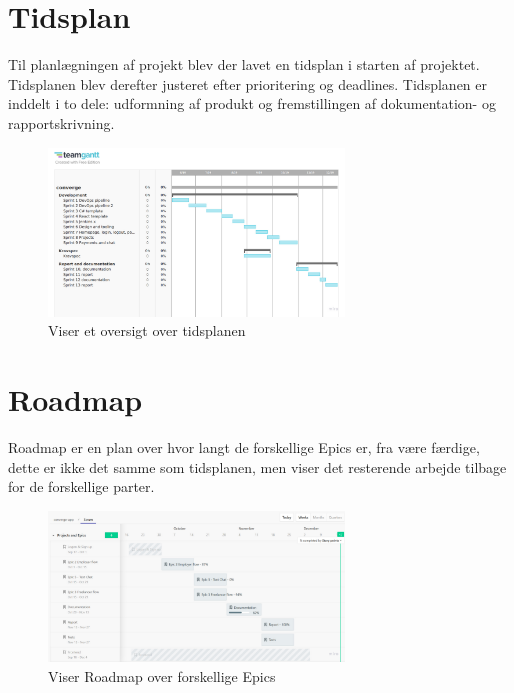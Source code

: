 \section{Tidsplan}

Til planlægningen af projekt blev der lavet en tidsplan i starten af projektet. Tidsplanen blev derefter justeret efter prioritering og deadlines. Tidsplanen er inddelt i to dele: udformning af produkt og fremstillingen af dokumentation- og rapportskrivning.

\begin{figure}[H]
    \centering
\includegraphics[width=0.7\textwidth]{Billeder/schedule1.pdf}
\caption{Viser et oversigt over tidsplanen}
\label{fig:figure4}
\end{figure}
\newpage
\section{Roadmap}

Roadmap er en plan over hvor langt de forskellige Epics er, fra være færdige, dette er ikke det samme som tidsplanen, men viser det resterende arbejde tilbage for de forskellige parter.


\begin{figure}[H]
    \centering
\includegraphics[width=0.7\textwidth]{Billeder/roadmap.pdf}
\caption{Viser Roadmap over forskellige Epics}
\label{fig:figure4}
\end{figure}
